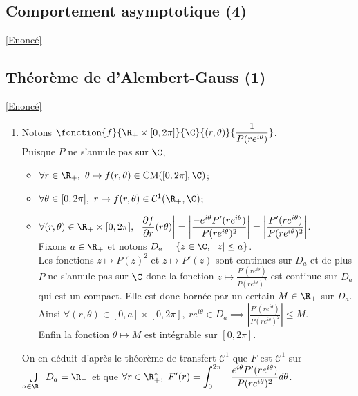 \documentclass{book}
\begin{document}
	\subsection{Comportement asymptotique (4)}
	\label{Comportement asymptotique (4) corrigé}
	\textcolor{blue}{\hyperref[Comportement asymptotique (4)]{[Enoncé]}}\\
	
	\subsection{Théorème de d'Alembert-Gauss (1) }\label{sec:theoreme-de-dalembert-gauss-1-etoile2}
	\textcolor{blue}{\hyperref[alembertgauss1]{[Enoncé]}}\\
	\begin{enumerate}[leftmargin=*]
		\item Notons $\fonction{f}{\R_+\times[0,2\pi]}{\C}{(r,\theta)}{\displaystyle\frac{1}{P(re^{i\theta})}}$.\\
		Puisque $P$ ne s'annule pas sur $\C$,
		\begin{itemize}
			\item $\forall r\in \R_+,\ \theta\mapsto f(r,\theta)\in \text{CM}([0,2\pi],\C)$;
			\item $\forall \theta\in [0,2\pi],\ r\mapsto f(r,\theta)\in \mathcal C^1(\R_+,\C)$;
			\item $\forall (r,\theta)\in \R_+\times[0,2\pi],\ \displaystyle\left|\frac{\partial f}{\partial r}(r\theta)\right|=\left|\frac{-e^{i\theta}P'(re^{i\theta})}{P(re^{i\theta})^2}\right|=\left|\frac{P'(re^{i\theta})}{P(re^{i\theta})^2}\right|$.\\
			Fixons $a\in \R_+$ et notons $D_a=\{z\in \C,\ |z|\leq a\}$.\\
			Les fonctions $z\mapsto P(z)^2$ et $z\mapsto P'(z)$ sont continues sur $D_a$ et de plus $P$ ne s'annule pas sur $\C$ donc la fonction $z\mapsto \displaystyle\frac{P'(re^{i\theta})}{P(re^{i\theta})^2}$ est continue sur $D_a$ qui est un compact. Elle est donc bornée par un certain $M\in \R_+$ sur $D_a$.\\
			Ainsi $\forall (r,\theta)\in [0,a]\times[0,2\pi],\ re^{i\theta}\in D_a\implies \displaystyle\left|\frac{P'(re^{i\theta})}{P(re^{i\theta})^2}\right|\leq M$.\\
			Enfin la fonction $\theta\mapsto M$ est intégrable sur $[0,2\pi]$.
		\end{itemize}
		On en déduit d'après le théorème de transfert $\mathcal C^1$ que $F$ est $\mathcal C^1$ sur $\bigcup\limits_{a\in \R_+}D_a=\R_+$ et que $\forall r\in \R^*_+,\ F'(r)=\displaystyle\int_0^{2\pi}-\frac{e^{i\theta}P'(re^{i\theta})}{P(re^{i\theta})^2}d\theta$.

\end{enumerate}
\end{document}
